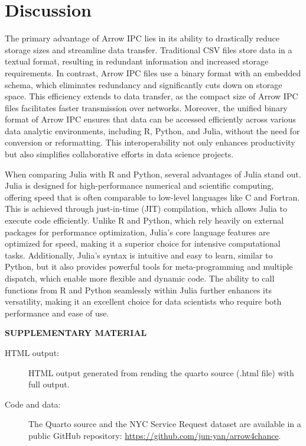 \documentclass[
  12pt]{article}
\begin{document}
\section{Discussion}\label{discussion}

The primary advantage of Arrow IPC lies in its ability to drastically
reduce storage sizes and streamline data transfer. Traditional CSV files
store data in a textual format, resulting in redundant information and
increased storage requirements. In contrast, Arrow IPC files use a
binary format with an embedded schema, which eliminates redundancy and
significantly cuts down on storage space. This efficiency extends to
data transfer, as the compact size of Arrow IPC files facilitates faster
transmission over networks. Moreover, the unified binary format of Arrow
IPC ensures that data can be accessed efficiently across various data
analytic environments, including R, Python, and Julia, without the need
for conversion or reformatting. This interoperability not only enhances
productivity but also simplifies collaborative efforts in data science
projects.

When comparing Julia with R and Python, several advantages of Julia
stand out. Julia is designed for high-performance numerical and
scientific computing, offering speed that is often comparable to
low-level languages like C and Fortran. This is achieved through
just-in-time (JIT) compilation, which allows Julia to execute code
efficiently. Unlike R and Python, which rely heavily on external
packages for performance optimization, Julia's core language features
are optimized for speed, making it a superior choice for intensive
computational tasks. Additionally, Julia's syntax is intuitive and easy
to learn, similar to Python, but it also provides powerful tools for
meta-programming and multiple dispatch, which enable more flexible and
dynamic code. The ability to call functions from R and Python seamlessly
within Julia further enhances its versatility, making it an excellent
choice for data scientists who require both performance and ease of use.

\label{supplementary-material}
\bigskip

\begin{center}

{\large\bf SUPPLEMENTARY MATERIAL}

\end{center}

\begin{description}
\item[HTML output:]
HTML output generated from rending the quarto source (.html file) with
full output.
\item[Code and data:]
The Quarto source and the NYC Service Request dataset are available in a
public GitHub repository: \url{https://github.com/jun-yan/arrow4chance}.
\end{description}


\renewcommand\refname{Further Reading}
  
\end{document}
